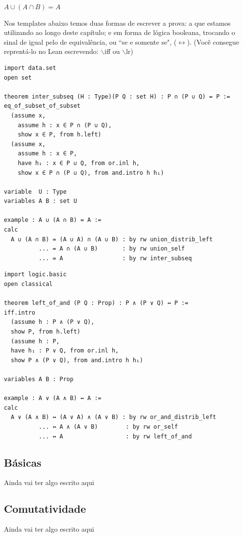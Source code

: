 \begin{center}
    $A \cup (A \cap B) = A$
\end{center}

Nos templates abaixo temos duas formas de escrever a prova: a que estamos utilizando ao longo deste capítulo; e em forma de lógica booleana, trocando o sinal de igual pelo de equivalência, ou ``se e somente se", ($\leftrightarrow$). (Você consegue reprentá-lo no Lean escrevendo: $\backslash$iff ou $\backslash$lr)

\begin{lstlisting}
import data.set
open set

theorem inter_subseq (H : Type)(P Q : set H) : P ∩ (P ∪ Q) = P :=
eq_of_subset_of_subset
  (assume x,
    assume h : x ∈ P ∩ (P ∪ Q),
    show x ∈ P, from h.left)
  (assume x,
    assume h : x ∈ P,
    have h₁ : x ∈ P ∪ Q, from or.inl h,
    show x ∈ P ∩ (P ∪ Q), from and.intro h h₁)

variable  U : Type
variables A B : set U

example : A ∪ (A ∩ B) = A :=
calc
  A ∪ (A ∩ B) = (A ∪ A) ∩ (A ∪ B) : by rw union_distrib_left
          ... = A ∩ (A ∪ B)       : by rw union_self
          ... = A                 : by rw inter_subseq
\end{lstlisting}

\begin{lstlisting}
import logic.basic
open classical

theorem left_of_and (P Q : Prop) : P ∧ (P ∨ Q) ↔ P :=
iff.intro
  (assume h : P ∧ (P ∨ Q),
  show P, from h.left)
  (assume h : P,
  have h₁ : P ∨ Q, from or.inl h,
  show P ∧ (P ∨ Q), from and.intro h h₁)

variables A B : Prop

example : A ∨ (A ∧ B) ↔ A :=
calc
  A ∨ (A ∧ B) ↔ (A ∨ A) ∧ (A ∨ B) : by rw or_and_distrib_left
          ... ↔ A ∧ (A ∨ B)        : by rw or_self
          ... ↔ A                  : by rw left_of_and
\end{lstlisting}

  \subsection{Básicas}
  Ainda vai ter algo escrito aqui

  \subsection{Comutatividade}
  Ainda vai ter algo escrito aqui

